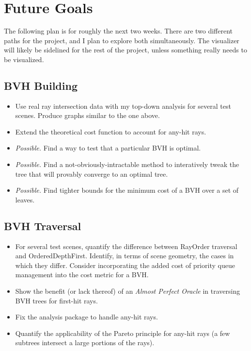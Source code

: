\documentclass{article}
\begin{document}
\section{Future Goals}
The following plan is for roughly the next two weeks.  There are two different paths for the project, and I plan to explore both simultaneously.  The visualizer will likely be sidelined for the rest of the project, unless something really needs to be visualized.
\subsection{BVH Building}
\begin{itemize}
\item Use real ray intersection data with my top-down analysis for several test scenes.  Produce graphs similar to the one above.
\item Extend the theoretical cost function to account for any-hit rays.
\item {\em Possible.} Find a way to test that a particular BVH is optimal.
\item {\em Possible.} Find a not-obviously-intractable method to interatively tweak the tree that will provably converge to an optimal tree.
\item {\em Possible.} Find tighter bounds for the minimum cost of a BVH over a set of leaves.
\end{itemize}
\subsection{BVH Traversal}
\begin{itemize}
\item For several test scenes, quantify the difference between RayOrder traversal and OrderedDepthFirst.  Identify, in terms of scene geometry, the cases in which they differ.  Consider incorporating the added cost of priority queue management into the cost metric for a BVH. 
\item Show the benefit (or lack thereof) of an {\em Almost Perfect Oracle} in traversing BVH trees for first-hit rays.
\item Fix the analysis package to handle any-hit rays.
\item Quantify the applicability of the Pareto principle for any-hit rays (a few subtrees intersect a large portions of the rays).
\end{itemize}
\end{document}
